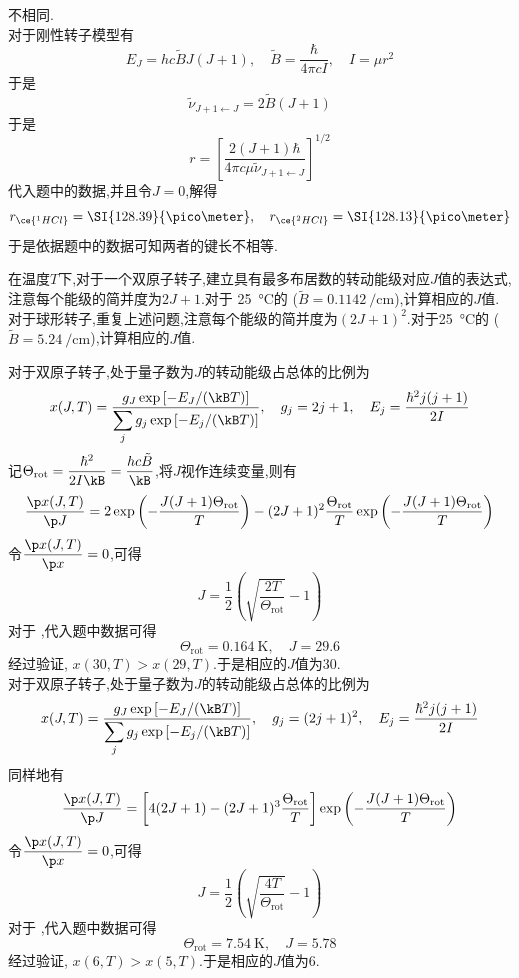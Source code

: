 \documentclass{ctexart}
\begin{document}
\begin{solution}
    不相同.\\
    对于刚性转子模型有
    \[E_J=hc\tilde{B}J(J+1),\quad \tilde{B}=\dfrac{\hbar}{4\pi cI},\quad I=\mu r^2\]
    于是
    \[\tilde{\nu}_{J+1\leftarrow J}=2\tilde{B}(J+1)\]
    于是
    \[r=\left[\dfrac{2(J+1)\hbar}{4\pi c\mu\tilde{\nu}_{J+1\leftarrow J}}\right]^{1/2}\]
    代入题中的数据,并且令$J=0$,解得
    \[r_{\ce{^1HCl}}=\SI{128.39}{\pico\meter},\quad r_{\ce{^2HCl}}=\SI{128.13}{\pico\meter}\]
    于是依据题中的数据可知两者的键长不相等.
\end{solution}
\begin{homework}[4.]
    在温度$T$下,对于一个双原子转子,建立具有最多布居数的转动能级对应$J$值的表达式,注意每个能级的简并度为$2J+1$.对于 \SI{25}{\celsius}的  ($\tilde{B}=\SI{0.1142}{\per\centi\meter}$),计算相应的$J$值.对于球形转子,重复上述问题,注意每个能级的简并度为$(2J+1)^2$.对于\SI{25}{\celsius}的  ($\tilde{B}=\SI{5.24}{\per\centi\meter}$),计算相应的$J$值.
\end{homework}
\begin{solution}
    对于双原子转子,处于量子数为$J$的转动能级占总体的比例为
    \[x(J,T)=\dfrac{g_J\exp\left[-E_J/(\kB T)\right]}{\displaystyle\sum_{j}g_j\exp\left[-E_j/(\kB T)\right]},\quad g_j=2j+1,\quad E_j=\dfrac{\hbar^2j(j+1)}{2I}\]
    记$\Theta_{\text{rot}}=\dfrac{\hbar^2}{2I\kB}=\dfrac{hc\tilde{B}}{\kB}$,将$J$视作连续变量,则有
    \[\dfrac{\p x(J,T)}{\p J}=2\exp\left(-\dfrac{J(J+1)\Theta_{\text{rot}}}{T}\right)-(2J+1)^2\dfrac{\Theta_{\text{rot}}}{T}\exp\left(-\dfrac{J(J+1)\Theta_{\text{rot}}}{T}\right)\]
    令$\dfrac{\p x(J,T)}{\p x}=0$,可得
    \[J=\dfrac12\left(\sqrt{\dfrac{2T}{\Theta_{\text{rot}}}}-1\right)\]
    对于 ,代入题中数据可得
    \[\Theta_{\text{rot}}=\SI{0.164}{\kelvin},\quad J=29.6\]
    经过验证, $x(30,T)>x(29,T)$.于是相应的$J$值为$30$.\\
    \indent 对于双原子转子,处于量子数为$J$的转动能级占总体的比例为
    \[x(J,T)=\dfrac{g_J\exp\left[-E_J/(\kB T)\right]}{\displaystyle\sum_{j}g_j\exp\left[-E_j/(\kB T)\right]},\quad g_j=(2j+1)^2,\quad E_j=\dfrac{\hbar^2j(j+1)}{2I}\]
    同样地有
    \[\dfrac{\p x(J,T)}{\p J}=\left[4(2J+1)-(2J+1)^3\dfrac{\Theta_{\text{rot}}}{T}\right]\exp\left(-\dfrac{J(J+1)\Theta_{\text{rot}}}{T}\right)\]
    令$\dfrac{\p x(J,T)}{\p x}=0$,可得
    \[J=\dfrac12\left(\sqrt{\dfrac{4T}{\Theta_{\text{rot}}}}-1\right)\]
    对于 ,代入题中数据可得
    \[\Theta_{\text{rot}}=\SI{7.54}{\kelvin},\quad J=5.78\]
    经过验证, $x(6,T)>x(5,T)$.于是相应的$J$值为$6$.
\end{solution}
\end{document}
